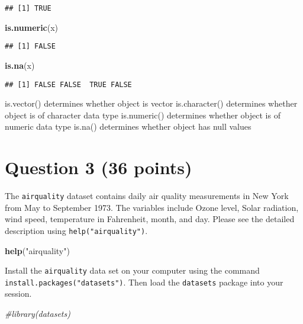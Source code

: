 \documentclass[
]{article}
\newenvironment{Shaded}{\begin{snugshade}}{\end{snugshade}}
\newcommand{\CommentTok}[1]{\textcolor[rgb]{0.56,0.35,0.01}{\textit{#1}}}
\newcommand{\FunctionTok}[1]{\textcolor[rgb]{0.13,0.29,0.53}{\textbf{#1}}}
\newcommand{\NormalTok}[1]{#1}
\newcommand{\StringTok}[1]{\textcolor[rgb]{0.31,0.60,0.02}{#1}}
\begin{document}
\begin{verbatim}
## [1] TRUE
\end{verbatim}

\begin{Shaded}
\begin{Highlighting}[]
\FunctionTok{is.numeric}\NormalTok{(x)}
\end{Highlighting}
\end{Shaded}

\begin{verbatim}
## [1] FALSE
\end{verbatim}

\begin{Shaded}
\begin{Highlighting}[]
\FunctionTok{is.na}\NormalTok{(x)}
\end{Highlighting}
\end{Shaded}

\begin{verbatim}
## [1] FALSE FALSE  TRUE FALSE
\end{verbatim}

is.vector() determines whether object is vector is.character()
determines whether object is of character data type is.numeric()
determines whether object is of numeric data type is.na() determines
whether object has null values

\hypertarget{question-3-36-points}{%
\section{Question 3 (36 points)}\label{question-3-36-points}}

The \texttt{airquality} dataset contains daily air quality measurements
in New York from May to September 1973. The variables include Ozone
level, Solar radiation, wind speed, temperature in Fahrenheit, month,
and day. Please see the detailed description using
\texttt{help("airquality")}.

\begin{Shaded}
\begin{Highlighting}[]
\FunctionTok{help}\NormalTok{(}\StringTok{"airquality"}\NormalTok{)}
\end{Highlighting}
\end{Shaded}

Install the \texttt{airquality} data set on your computer using the
command \texttt{install.packages("datasets")}. Then load the
\texttt{datasets} package into your session.

\begin{Shaded}
\begin{Highlighting}[]
\CommentTok{\#library(datasets)}
\end{Highlighting}
\end{Shaded}
\end{document}
